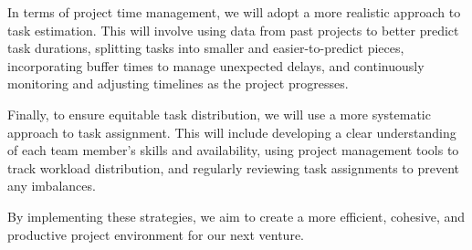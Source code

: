 \documentclass{article}
\begin{document}
In terms of project time management, we will adopt a more realistic approach to task estimation. This will involve using data from past projects to better predict task durations, splitting tasks into smaller and easier-to-predict pieces, incorporating buffer times to manage unexpected delays, and continuously monitoring and adjusting timelines as the project progresses.

Finally, to ensure equitable task distribution, we will use a more systematic approach to task assignment. This will include developing a clear understanding of each team member’s skills and availability, using project management tools to track workload distribution, and regularly reviewing task assignments to prevent any imbalances.

By implementing these strategies, we aim to create a more efficient, cohesive, and productive project environment for our next venture.
\end{document}
